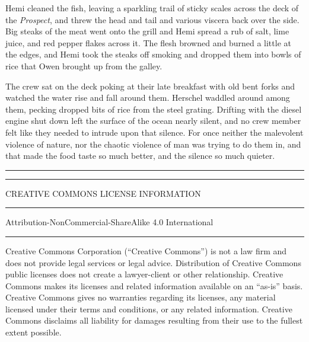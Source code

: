\documentclass[]{scrbook}
\begin{document}
Hemi cleaned the fish, leaving a sparkling trail of sticky scales across
the deck of the \emph{Prospect}, and threw the head and tail and various
viscera back over the side. Big steaks of the meat went onto the grill
and Hemi spread a rub of salt, lime juice, and red pepper flakes across
it. The flesh browned and burned a little at the edges, and Hemi took
the steaks off smoking and dropped them into bowls of rice that Owen
brought up from the galley.

The crew sat on the deck poking at their late breakfast with old bent
forks and watched the water rise and fall around them. Herschel waddled
around among them, pecking dropped bits of rice from the steel grating.
Drifting with the diesel engine shut down left the surface of the ocean
nearly silent, and no crew member felt like they needed to intrude upon
that silence. For once neither the malevolent violence of nature, nor
the chaotic violence of man was trying to do them in, and that made the
food taste so much better, and the silence so much quieter.

\newpage
\tiny
\begin{center}\rule{0.5\linewidth}{\linethickness}\end{center}

\begin{center}\rule{0.5\linewidth}{\linethickness}\end{center}

CREATIVE COMMONS LICENSE INFORMATION

\begin{center}\rule{0.5\linewidth}{\linethickness}\end{center}

Attribution-NonCommercial-ShareAlike 4.0 International

\begin{center}\rule{0.5\linewidth}{\linethickness}\end{center}

Creative Commons Corporation (``Creative Commons'') is not a law firm
and does not provide legal services or legal advice. Distribution of
Creative Commons public licenses does not create a lawyer-client or
other relationship. Creative Commons makes its licenses and related
information available on an ``as-is'' basis. Creative Commons gives no
warranties regarding its licenses, any material licensed under their
terms and conditions, or any related information. Creative Commons
disclaims all liability for damages resulting from their use to the
fullest extent possible.
\end{document}
